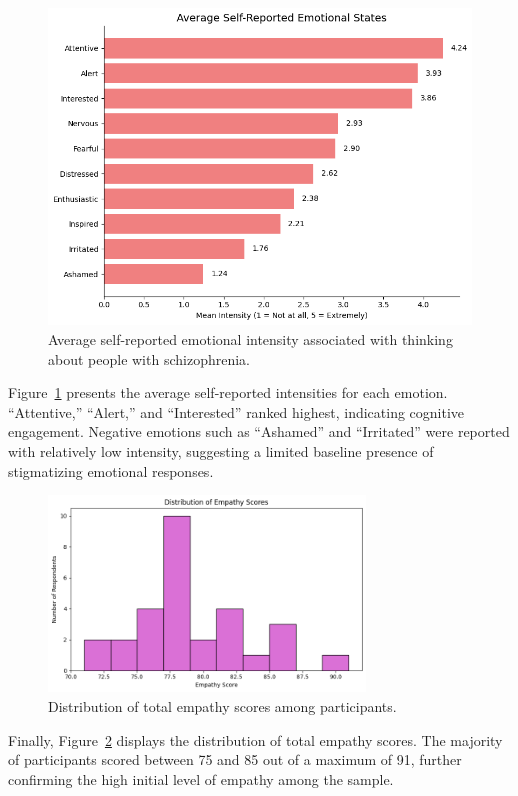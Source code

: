 \begin{figure}[htbp]
    \centering
    \includegraphics[width=0.7\columnwidth]{../../Figures/avg-emotions-pre.png}
    \caption{Average self-reported emotional intensity associated with thinking about people with schizophrenia.}
    \label{fig:avg_emotions_pre}
\end{figure}

Figure~\ref{fig:avg_emotions_pre} presents the average self-reported intensities for each emotion. “Attentive,” “Alert,” and “Interested” ranked highest, indicating cognitive engagement. Negative emotions such as “Ashamed” and “Irritated” were reported with relatively low intensity, suggesting a limited baseline presence of stigmatizing emotional responses.

\begin{figure}[H]
    \centering
    \includegraphics[width=0.75\textwidth]{../../Figures/avg-scores-summary-pre.png}
    \caption{Distribution of total empathy scores among participants.}
    \label{fig:score_distribution_pre}
\end{figure}

Finally, Figure~\ref{fig:score_distribution_pre} displays the distribution of total empathy scores. The majority of participants scored between 75 and 85 out of a maximum of 91, further confirming the high initial level of empathy among the sample.

